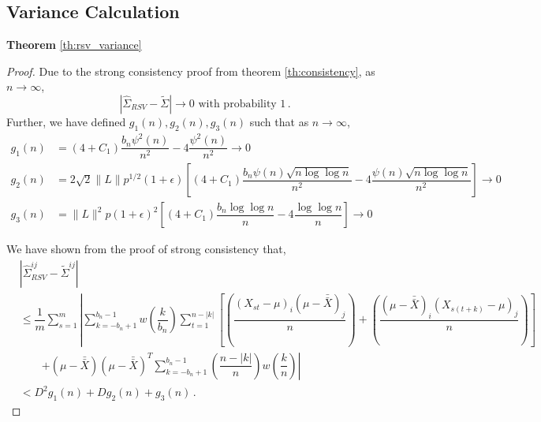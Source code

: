 \documentclass[11pt]{article}
\theoremstyle{remark}
\begin{document}
\subsection{Variance Calculation}
\label{appendix:variance}
\textbf{Theorem } \ref{th:rsv_variance}
\begin{proof}
 Due to the strong consistency proof from theorem \ref{th:consistency}, as $n \to \infty$,
\begin{equation}
\label{eq:rsv_asv_consis}
 \left|\hat{\Sigma}_{RSV} -  \tilde{\Sigma}\right| \to 0 \text{ with probability 1}\,. 
\end{equation}
Further, we have defined $g_1(n), g_2(n), g_3(n)$ such that as $n \to \infty$,
\begin{align*}
    g_1(n) &= (4+C_1)\dfrac{b_n \psi^2(n)}{n^2} - 4\dfrac{\psi^2(n)}{n^2} \to 0\\
    g_2(n) &= 2\sqrt{2}\|L\|p^{1/2}(1+\epsilon)\left[(4+C_1)\dfrac{b_n\psi(n)\sqrt{n\log \log n}}{n^2} - 4\dfrac{\psi(n)\sqrt{n\log \log n}}{n^2}\right] \to 0\\
    g_3(n) &= \|L\|^2 p (1+\epsilon)^2\left[(4+C_1)\dfrac{b_n \log\log n}{n} - 4 \dfrac{\log \log n}{n}\right] \to 0
\end{align*}

We have shown from the proof of strong consistency that,
\begin{align*}
 &\left| \hat{\Sigma}_{RSV}^{ij} - \tilde{\Sigma}^{ij} \right|\\
 & \leq \dfrac{1}{m} \sum_{s=1}^m \left| \sum_{k=-b_n+1}^{b_n-1} w \left(\dfrac{k}{b_n} \right) \sum_{t=1}^{n-|k|}   \left[ \left( \dfrac{(X_{st} - \mu)_i(\mu-\bar{\bar{X}})_j}{n}\right)+ \left(\dfrac{(\mu-\bar{\bar{X}})_i(X_{s(t+k)}-\mu)_j}{n}\right) \right] \right.\\
& \quad \quad  \left. + (\mu-\bar{\bar{X}})(\mu-\bar{\bar{X}})^T\sum_{k=-b_n+1}^{b_n-1}\left(\dfrac{n-|k|}{n}\right)w\left(\dfrac{k}{n}\right) \right| \\ 
 & < D^2g_1(n) + Dg_2(n) + g_3(n)\,.
\end{align*}


\end{proof}
\end{document}
